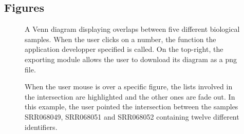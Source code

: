 \documentclass{bmcart}
\begin{document}
\begin{backmatter}



\section*{Figures}
  \begin{figure}[h!]
  \caption{
      A Venn diagram displaying overlaps between five different biological samples. When 
      the user clicks on a number, the function the application developper specified is called. 
      On the top-right, the exporting module allows the user to download its diagram as a png 
      file.}
      \end{figure}

\begin{figure}[h!]
  \caption{
      When the user mouse is over a specific figure, the lists involved in the intersection
      are highlighted and the other ones are fade out. In this example, the user pointed the
      intersection between the samples SRR068049, SRR068051 and SRR068052 containing
      twelve different identifiers.}
      \end{figure}

\end{backmatter}
\end{document}
